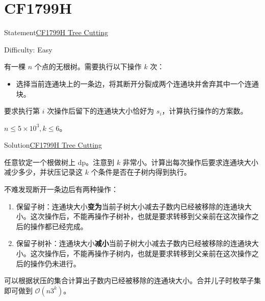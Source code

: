 \documentclass{beamer}
\begin{document}
    \section{CF1799H}

    \begin{frame}{Statement}{\href{https://codeforces.com/problemset/problem/1799/H}{CF1799H Tree Cutting}}

        Difficulty: Easy

        有一棵 $n$ 个点的无根树。需要执行以下操作 $k$ 次：

        \begin{itemize}
            \item 选择当前连通块上的一条边，将其断开分裂成两个连通块并舍弃其中一个连通块。
        \end{itemize}

        要求执行第 $i$ 次操作后留下的连通块大小恰好为 $s_{i}$，计算执行操作的方案数。

        $n \leq 5 \times 10^{3}, k \leq 6$。
		
	\end{frame}

    \begin{frame}{Solution}{\href{https://codeforces.com/problemset/problem/1799/H}{CF1799H Tree Cutting}}

        任意钦定一个根做树上 dp。注意到 $k$ 非常小。计算出每次操作后要求连通块大小减少多少，并状压记录这 $k$ 个条件是否在子树内得到执行。

        \pause
        
        不难发现断开一条边后有两种操作：

        \pause

        \begin{enumerate}
            \item 保留子树：连通块大小\textbf{变为}当前子树大小减去子数内已经被移除的连通块大小。这次操作后，不能再操作子树补，也就是要求转移到父亲前在这次操作之后的操作都已经完成。

            \pause
            
            \item 保留子树补：连通块大小\textbf{减小}当前子树大小减去子数内已经被移除的连通块大小。这次操作后，不能再操作子树内，也就是要求转移到父亲前在这次操作之后的操作仍未进行。
        \end{enumerate}

        \pause
        
        可以根据状压的集合计算出子数内已经被移除的连通块大小。合并儿子时枚举子集即可做到 $\mathcal{O}(n3^{k})$。
		
	\end{frame}
\end{document}
